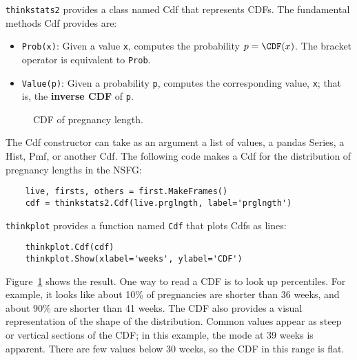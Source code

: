 {\tt thinkstats2} provides a class named Cdf that represents
CDFs.  The fundamental methods Cdf provides are:

\begin{itemize}

\item {\tt Prob(x)}: Given a value {\tt x}, computes the probability
  $p = \CDF(x)$.  The bracket operator is equivalent to {\tt Prob}.

\item {\tt Value(p)}: Given a probability {\tt p}, computes the
corresponding value, {\tt x}; that is, the {\bf inverse CDF} of {\tt p}.

\end{itemize}

\begin{figure}
\caption{CDF of pregnancy length.}
\label{cumulative_prglngth_cdf}
\end{figure}

The Cdf constructor can take as an argument a list of values,
a pandas Series, a Hist, Pmf, or another Cdf.  The following
code makes a Cdf for the distribution of pregnancy lengths in
the NSFG:

\begin{verbatim}
    live, firsts, others = first.MakeFrames()
    cdf = thinkstats2.Cdf(live.prglngth, label='prglngth')
\end{verbatim}

{\tt thinkplot} provides a function named {\tt Cdf} that
plots Cdfs as lines:

\begin{verbatim}
    thinkplot.Cdf(cdf)
    thinkplot.Show(xlabel='weeks', ylabel='CDF')
\end{verbatim}

Figure~\ref{cumulative_prglngth_cdf} shows the result.  One way to
read a CDF is to look up percentiles.  For example, it looks like
about 10\% of pregnancies are shorter than 36 weeks, and about 90\%
are shorter than 41 weeks.  The CDF also provides a visual
representation of the shape of the distribution.  Common values appear
as steep or vertical sections of the CDF; in this example, the mode at
39 weeks is apparent.  There are few values below 30 weeks, so
the CDF in this range is flat.


